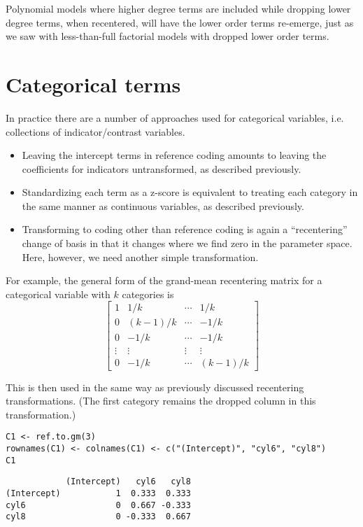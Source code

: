 \documentclass[]{article}
\providecommand{\tightlist}{%
  \setlength{\itemsep}{0pt}\setlength{\parskip}{0pt}}
\begin{document}
Polynomial models where higher degree terms are included while dropping
lower degree terms, when recentered, will have the lower order terms
re-emerge, just as we saw with less-than-full factorial models with
dropped lower order terms.

\hypertarget{categorical-terms}{%
\section{Categorical terms}\label{categorical-terms}}

In practice there are a number of approaches used for categorical
variables, i.e. collections of indicator/contrast variables.

\begin{itemize}
\tightlist
\item
  Leaving the intercept terms in reference coding amounts to leaving the
  coefficients for indicators untransformed, as described previously.
\item
  Standardizing each term as a z-score is equivalent to treating each
  category in the same manner as continuous variables, as described
  previously.
\item
  Transforming to coding other than reference coding is again a
  ``recentering'' change of basis in that it changes where we find zero
  in the parameter space. Here, however, we need another simple
  transformation.
\end{itemize}

For example, the general form of the grand-mean recentering matrix for a
categorical variable with \(k\) categories is \[
\begin{bmatrix}
1 &1/k     &\cdots &1/k \\
0 &(k-1)/k &\cdots &-1/k \\
0 &-1/k    &\cdots &-1/k \\
\vdots &\vdots &\vdots &\vdots \\
0 &-1/k    &\cdots &(k-1)/k
\end{bmatrix}
\]

This is then used in the same way as previously discussed recentering
transformations. (The first category remains the dropped column in this
transformation.)

\begin{verbatim}
C1 <- ref.to.gm(3)
rownames(C1) <- colnames(C1) <- c("(Intercept)", "cyl6", "cyl8")
C1
\end{verbatim}

\begin{verbatim}
            (Intercept)   cyl6   cyl8
(Intercept)           1  0.333  0.333
cyl6                  0  0.667 -0.333
cyl8                  0 -0.333  0.667
\end{verbatim}
\end{document}

